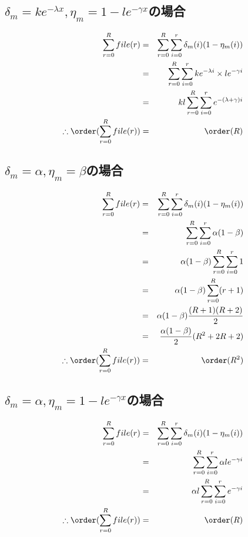\subsection{$\delta_m = k e^{-\lambda x}, \eta_m = 1 - l e^{-\gamma x}$の場合}
\begin{eqnarray*}
	\sum_{r=0}^R file(r) &=& \sum_{r=0}^R \sum_{i=0}^r \delta_m(i) (1 - \eta_m(i)) \\
	&=& \sum_{r=0}^R \sum_{i=0}^r k e^{-\lambda i} \times l e ^{- \gamma i} \\
	&=&  kl \sum_{r=0}^R \sum_{i=0}^r e^{-(\lambda + \gamma) i} \\
	\therefore \order(\sum_{r=0}^R file(r)) &=& \order(R)
\end{eqnarray*}


\subsection{$\delta_m = \alpha, \eta_m = \beta$の場合}
\begin{eqnarray*}
	\sum_{r=0}^R file(r) &=& \sum_{r=0}^R \sum_{i=0}^r \delta_m(i) (1 - \eta_m(i)) \\
	&=& \sum_{r=0}^R \sum_{i=0}^r \alpha (1 - \beta) \\
	&=& \alpha (1 - \beta) \sum_{r=0}^R \sum_{i=0}^r 1 \\
	&=& \alpha (1 - \beta) \sum_{r=0}^R (r+1) \\
	&=& \alpha (1 - \beta) \frac{(R+1)(R+2)}{2} \\
	&=& \frac{\alpha (1 - \beta)}{2} (R^2 + 2R + 2) \\
	\therefore \order(\sum_{r=0}^R file(r)) &=& \order(R^2)
\end{eqnarray*}


\subsection{$\delta_m = \alpha, \eta_m = 1 - l e^{-\gamma x}$の場合}
\begin{eqnarray*}
	\sum_{r=0}^R file(r) &=& \sum_{r=0}^R \sum_{i=0}^r \delta_m(i) (1 - \eta_m(i)) \\
	&=& \sum_{r=0}^R \sum_{i=0}^r \alpha l e^{-\gamma i} \\
	&=&  \alpha l \sum_{r=0}^R \sum_{i=0}^r e^{-\gamma i} \\
	\therefore \order(\sum_{r=0}^R file(r)) &=& \order(R)
\end{eqnarray*}
